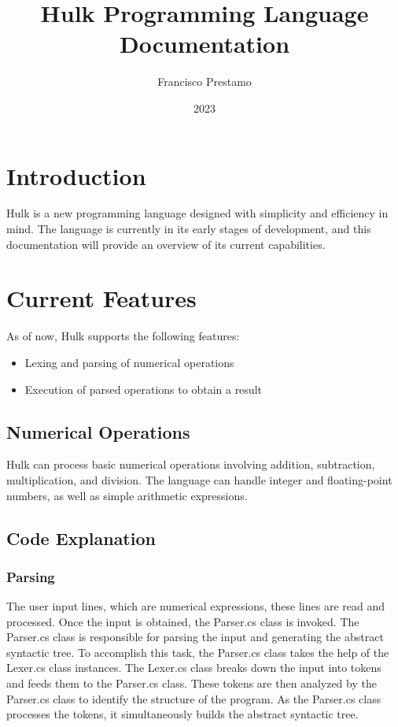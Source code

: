 \documentclass[12pt]{article}
\title{Hulk Programming Language Documentation}
\author{Francisco Prestamo}
\date{2023}
\begin{document}
\maketitle

\section{Introduction}
Hulk is a new programming language designed with simplicity and efficiency in mind. The language is currently in its early stages of development, and this documentation will provide an overview of its current capabilities.

\section{Current Features}
As of now, Hulk supports the following features:

\begin{itemize}
    \item Lexing and parsing of numerical operations
    \item Execution of parsed operations to obtain a result
\end{itemize}

\subsection{Numerical Operations}
Hulk can process basic numerical operations involving addition, subtraction, multiplication, and division. The language can handle integer and floating-point numbers, as well as simple arithmetic expressions.

\subsection{Code Explanation}
\subsubsection{Parsing}
The user input lines, which are numerical expressions, these lines are read and processed. Once the input is obtained, the Parser.cs class is invoked. The Parser.cs class is responsible for parsing the input and generating the abstract syntactic tree.
To accomplish this task, the Parser.cs class takes the help of the Lexer.cs class instances. The Lexer.cs class breaks down the input into tokens and feeds them to the Parser.cs class. These tokens are then analyzed by the Parser.cs class to identify the structure of the program. As the Parser.cs class processes the tokens, it simultaneously builds the abstract syntactic tree.
\end{document}
